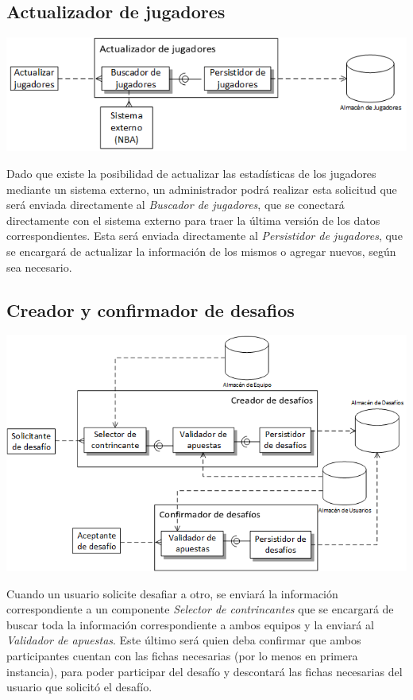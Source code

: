 \subsection{Actualizador de jugadores}
\begin{center}
\includegraphics[scale=0.80]{diagramas/tp1/buscadordejugadores.png}
\end{center}
\label{fig:buscadordejugadores}

Dado que existe la posibilidad de actualizar las estadísticas de los jugadores mediante un sistema externo, un administrador podrá realizar esta solicitud que será enviada directamente al \emph{Buscador de jugadores}, que se conectará directamente con el sistema externo para traer la última versión de los datos correspondientes. Esta será enviada directamente al \emph{Persistidor de jugadores}, que se encargará de actualizar la información de los mismos o agregar nuevos, según sea necesario.

\subsection{Creador y confirmador de desafios}
\includegraphics[scale=0.80]{diagramas/tp1/desafios.png}
\label{fig:desafios}

Cuando un usuario solicite desafiar a otro, se enviará la información correspondiente a un componente \emph{Selector de contrincantes} que se encargará de buscar toda la información correspondiente a ambos equipos y la enviará al \emph{Validador de apuestas}. Este último será quien deba confirmar que ambos participantes cuentan con las fichas necesarias (por lo menos en primera instancia), para poder participar del desafío y descontará las fichas necesarias del usuario que solicitó el desafío.

